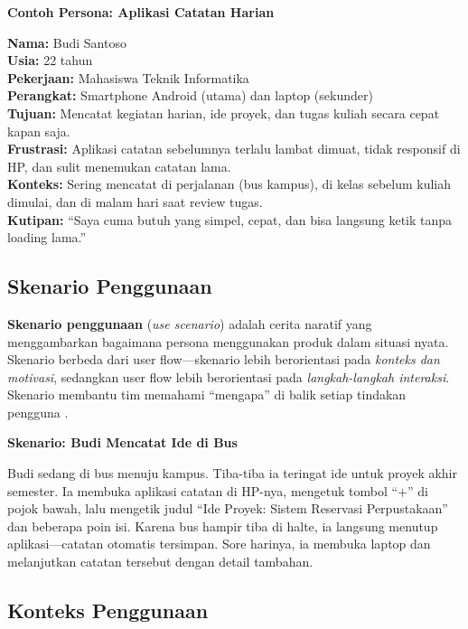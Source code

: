 \begin{contoh}
\textbf{Contoh Persona: Aplikasi Catatan Harian}

\textbf{Nama:} Budi Santoso\\
\textbf{Usia:} 22 tahun\\
\textbf{Pekerjaan:} Mahasiswa Teknik Informatika\\
\textbf{Perangkat:} Smartphone Android (utama) dan laptop (sekunder)\\
\textbf{Tujuan:} Mencatat kegiatan harian, ide proyek, dan tugas kuliah secara cepat kapan saja.\\
\textbf{Frustrasi:} Aplikasi catatan sebelumnya terlalu lambat dimuat, tidak responsif di HP, dan sulit menemukan catatan lama.\\
\textbf{Konteks:} Sering mencatat di perjalanan (bus kampus), di kelas sebelum kuliah dimulai, dan di malam hari saat review tugas.\\
\textbf{Kutipan:} ``Saya cuma butuh yang simpel, cepat, dan bisa langsung ketik tanpa loading lama.''
\end{contoh}

\subsection{Skenario Penggunaan}

\textbf{Skenario penggunaan} (\textit{use scenario}) adalah cerita naratif yang menggambarkan bagaimana persona menggunakan produk dalam situasi nyata. Skenario berbeda dari user flow---skenario lebih berorientasi pada \textit{konteks dan motivasi}, sedangkan user flow lebih berorientasi pada \textit{langkah-langkah interaksi}. Skenario membantu tim memahami ``mengapa'' di balik setiap tindakan pengguna \cite{nngroup}.

\begin{contoh}
\textbf{Skenario: Budi Mencatat Ide di Bus}

Budi sedang di bus menuju kampus. Tiba-tiba ia teringat ide untuk proyek akhir semester. Ia membuka aplikasi catatan di HP-nya, mengetuk tombol ``+'' di pojok bawah, lalu mengetik judul ``Ide Proyek: Sistem Reservasi Perpustakaan'' dan beberapa poin isi. Karena bus hampir tiba di halte, ia langsung menutup aplikasi---catatan otomatis tersimpan. Sore harinya, ia membuka laptop dan melanjutkan catatan tersebut dengan detail tambahan.
\end{contoh}

\subsection{Konteks Penggunaan}

